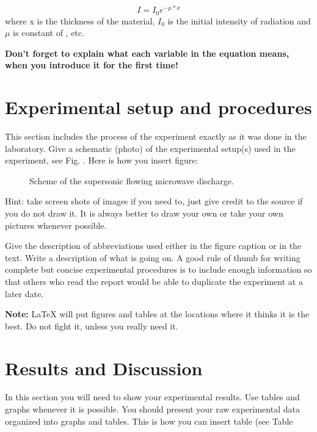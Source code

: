\documentclass[twocolumn,secnumarabic,amssymb, nobibnotes, aps, pra]{revtex4}
\begin{document}
\begin{equation}
I = I_0 e^{-\mu * x}
\label{Attenuation}   %
\end{equation}
where x is the thickness of the material, $I_0$  is the initial intensity of radiation and $\mu$ is constant of  , etc. 

{\bf Don't forget to explain what each variable in the equation means, when you introduce it for the first time!}  %

\section{Experimental setup and procedures}

This section includes the process of the experiment exactly as it was done in the laboratory. Give a schematic (photo) of the experimental setup(s) used in the experiment, see Fig. . Here is how you insert figure:
\begin{figure} [htb]  %
\begin{center}

\end{center}
\caption{Scheme of the supersonic flowing microwave discharge.}
\label{fig:samplesetup}
\end{figure}
Hint: take screen shots of images if you need to, just give credit to the source if you do not draw it.  It is always better to draw your own or take your own pictures whenever possible.

Give the description of abbreviations used either in the figure caption or in the text. Write a description of what is going on. A good rule of thumb for writing complete but concise experimental procedures is to include enough information so that others who read the report would be able to duplicate the experiment at a later date. 

{\bf Note:} LaTeX will put figures and tables at the locations where it thinks it is the best. Do not fight it, unless you really need it.


\section{Results and Discussion}

In this section you will need to show your experimental results. Use tables and graphs whenever it is possible. You should present your raw experimental data organized into graphs and tables. This is how you can insert table (see Table 
\end{document}
